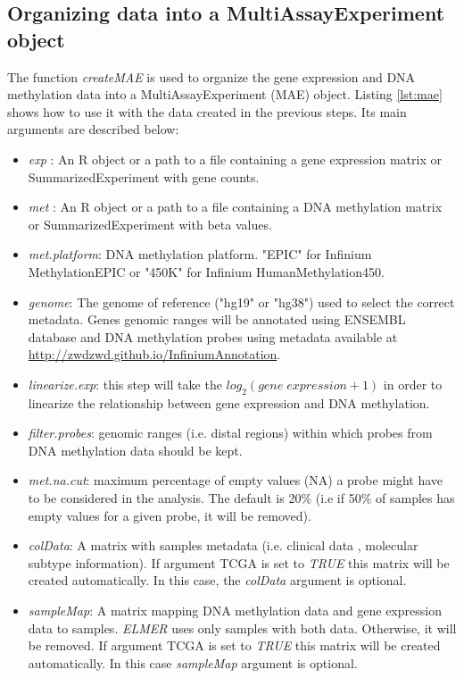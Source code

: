 %


\subsection*{Organizing data into a MultiAssayExperiment object}
The function \textit{createMAE} is used to organize the gene expression and DNA methylation data into a MultiAssayExperiment (MAE) object. Listing \ref{lst:mae} shows how to use it with the data created in the previous steps. Its main arguments are described below:

\begin{itemize}
\item \textit{exp} : An R object or a path to a file containing a gene expression 
    matrix or SummarizedExperiment with gene counts.
\item \textit{met} : An R object or a path to a file containing a DNA methylation 
    matrix or SummarizedExperiment with beta values.
\item \textit{met.platform}: DNA methylation platform.
    "EPIC" for Infinium MethylationEPIC or "450K" for 
    Infinium HumanMethylation450.
 \item \textit{genome}: The genome of reference ("hg19" or "hg38") 
    used to select the correct metadata. Genes genomic ranges will be annotated
    using ENSEMBL database and DNA methylation probes
    using metadata available at \url{http://zwdzwd.github.io/InfiniumAnnotation}.
 \item \textit{linearize.exp}: this step will take the $log_2(gene\; expression + 1)$
    in order to linearize the relationship between 
    gene expression and DNA methylation.
 \item \textit{filter.probes}: genomic ranges (i.e. distal
    regions) within which  probes from 
    DNA methylation data should be kept.
 \item \textit{met.na.cut}: maximum percentage of empty values (NA) a probe might have to be 
    considered in the analysis. The default is 20\% (i.e if 50\% of samples has empty values  for a given 
    probe, it will be removed).
 \item \textit{colData}: A matrix  with samples metadata (i.e. clinical data ,
    molecular  subtype information). If argument TCGA is set to \textit{TRUE}
    this matrix will be created automatically. In this case, the \textit{colData} 
    argument is optional.
 \item \textit{sampleMap}: A matrix mapping DNA methylation data and gene expression
    data to samples. \textit{ELMER} uses only samples with both data. 
    Otherwise,  it will be removed. If argument TCGA is set to \textit{TRUE}
    this matrix will be created automatically. In this case \textit{sampleMap} 
    argument is optional.
\end{itemize}

